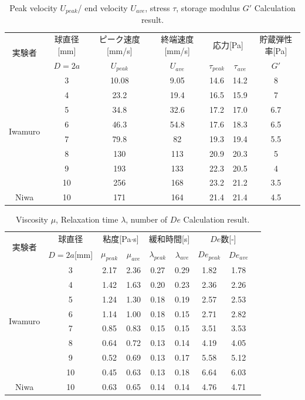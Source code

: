 \begin{table}[hbtp]
    \caption{Peak velocity $U_{peak}$/ end velocity $U_{ave}$, stress $\tau$, storage modulus $G'$ Calculation result.}
    \label{table:iwamuro}
    \centering
    \begin{tabular}{ccccccc}
      \hline
      \multirow{2}{*}{実験者} & 球直径[mm] & ピーク速度[mm/s] & 終端速度[mm/s] &\multicolumn{2}{c}{応力[Pa]} & 貯蔵弾性率[Pa] \\
       & $D=2a$ & $U_{peak}$ & $U_{ave}$ &  $\tau_{peak}$ & $\tau_{ave}$ & $G'$\\
      \hline \hline
      \multirow{8}{*}{Iwamuro} & 3  & 10.08 & 9.05 & 14.6 & 14.2 & 8\\
      & 4  & 23.2 & 19.4 & 16.5 & 15.9 & 7\\
      & 5  & 34.8 & 32.6 & 17.2 & 17.0 & 6.7 \\
      & 6  & 46.3 & 54.8 & 17.6 & 18.3 & 6.5\\
      & 7  & 79.8 & 82 & 19.3 & 19.4 & 5.5\\
      & 8  & 130 & 113 & 20.9 & 20.3 & 5 \\
      & 9  & 193 & 133 & 22.3 & 20.5 & 4\\
      & 10 & 256 & 168 & 23.2 & 21.2 & 3.5\\
      \hline \hline
      Niwa & 10 & 171 & 164 & 21.4 & 21.4 & 4.5 \\
      \hline
    \end{tabular}
\end{table}
\begin{table}[hbtp]
    \caption{Viscosity $\mu$, Relaxation time $\lambda$, number of $De$ Calculation result.}
    \label{table:iwamuro2}
    \centering
    \begin{tabular}{ccccccccc}
      \hline
      \multirow{2}{*}{実験者} & 球直径 &\multicolumn{2}{c}{粘度[Pa$\cdot$s]} &\multicolumn{2}{c}{緩和時間[s]}  &\multicolumn{2}{c}{$De$数[-]} \\
       & $D=2a$[mm] & $\mu_{peak}$ & $\mu_{ave}$  &  $\lambda_{peak}$ & $\lambda_{ave}$ & $De_{peak}$ & $De_{ave}$ \\
      \hline \hline
      \multirow{8}{*}{Iwamuro} & 3  & 2.17 & 2.36 & 0.27 & 0.29 & 1.82 & 1.78\\
      & 4  & 1.42 & 1.63 & 0.20 & 0.23 & 2.36 & 2.26\\
      & 5  & 1.24 & 1.30 & 0.18 & 0.19 & 2.57 & 2.53 \\
      & 6  & 1.14 & 1.00 & 0.18 & 0.15 & 2.71 & 2.82\\
      & 7  & 0.85 & 0.83 & 0.15 & 0.15 & 3.51 & 3.53\\
      & 8  & 0.64 & 0.72 & 0.13 & 0.14 & 4.19 & 4.05 \\
      & 9  & 0.52 & 0.69 & 0.13 & 0.17 & 5.58 & 5.12\\
      & 10 & 0.45 & 0.63 & 0.13 & 0.18 & 6.64 & 6.03\\
      \hline \hline
      Niwa & 10 & 0.63 & 0.65 & 0.14 & 0.14 & 4.76 & 4.71 \\
      \hline
    \end{tabular}
\end{table}
